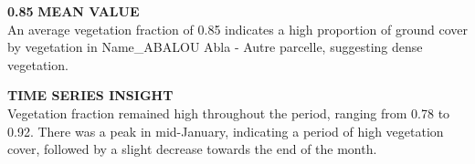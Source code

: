 \documentclass[12pt,a4paper]{article}
\begin{document}
\vspace{0.5cm}

\parbox{\textwidth}{ %
    \begin{minipage}[t]{0.48\textwidth}
        \vspace{0.3cm}
        \textbf{\Large{0.85}}
        \vspace{0.3cm}
        \textbf{MEAN VALUE}\\
        An average vegetation fraction of 0.85 indicates a high proportion of ground cover by vegetation in Name\_ABALOU Abla - Autre parcelle, suggesting dense vegetation.
        \vspace{0.5cm}

        \textbf{TIME SERIES INSIGHT}\\
        Vegetation fraction remained high throughout the period, ranging from 0.78 to 0.92. There was a peak in mid-January, indicating a period of high vegetation cover, followed by a slight decrease towards the end of the month.
    \end{minipage}\hfill
    \begin{minipage}[t]{0.48\textwidth}
        \begin{center}
\end{center}
\end{minipage}}
\end{document}
